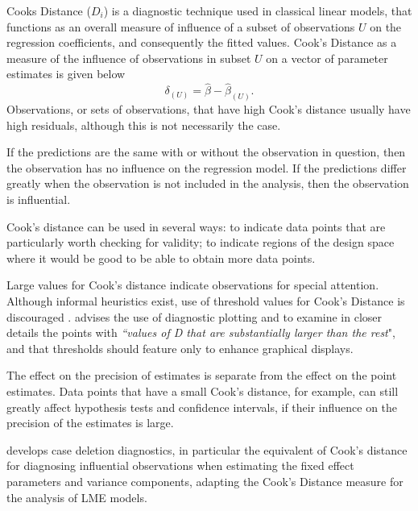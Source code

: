 \documentclass[12pt, a4paper]{report}
\theoremstyle{definition}
\theoremstyle{remark}
\begin{document}
 Cooks Distance ($D_{i}$) is a diagnostic technique used in classical linear models, that functions as an overall measure of influence of a subset of observations $U$ on the regression coefficients, and consequently the fitted values.  Cook's Distance as a measure of the influence of observations in subset $U$ on a vector of parameter estimates is given below \citep{cook77}
\[ \delta_{(U)} = \hat{\beta} - \hat{\beta}_{(U)}.\]
Observations, or sets of observations, that have high Cook's distance usually have high residuals, although this is not necessarily the case.


If the predictions are the same with or without the observation in question, then the observation has no influence on the regression model. If the predictions differ greatly when the observation is not included in the analysis, then the observation is influential.

Cook's distance can be used in several ways: to indicate data points that are particularly worth checking for validity; to indicate regions of the design space where it would be good to be able to obtain more data points.


Large values for Cook's distance indicate observations for special attention. Although informal heuristics exist, use of threshold values for Cook's Distance is discouraged \citep{fox1991}. \citet{fox1991} advises the use of diagnostic plotting and to examine in closer details the points with \textit{``values of D that are substantially larger than the rest}", and that thresholds should feature only to enhance graphical displays.

The effect on the precision of estimates is separate from the effect on the point estimates. Data points that have a small Cook's distance, for example, can still greatly affect hypothesis tests and confidence intervals, if their  influence on the precision of the estimates is large.

\citet{Christensen} develops  case deletion diagnostics, in particular the equivalent of  Cook's distance for diagnosing influential observations when estimating the fixed effect parameters and variance components, adapting the Cook's Distance measure for the analysis of LME models. 
\end{document}

